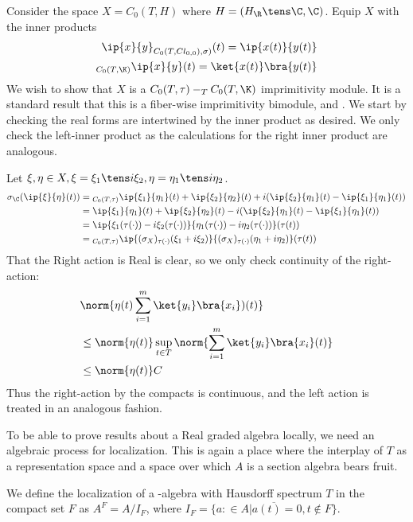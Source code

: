 \begin{example}
	Consider the space $X=C_0(T,H)$ where $H=(H_\R\tens \C,\C)$. Equip $X$ with the inner products 
	\begin{align*}
		\ip{x}{y}_{C_0(T,Cl_{0,0}),\sigma)}(t)=\ip{x(t)}{y(t)} \\
		{}_{C_0(T,\K)}\ip{x}{y}(t)=\ket{x(t)}\bra{y(t)}
	\end{align*}
	We wish to show that $X$ is a $C_0(T,\tau)-_T C_0(T,\K)$ imprimitivity module.
	It is a standard result that this is a fiber-wise imprimitivity bimodule, \cite[Chapter 3]{raeburncont} and \cite[Lemma 2.17]{moutou}. We start by checking the real forms are intertwined by the inner product as desired. We only check the left-inner product as the calculations for the right inner product are analogous. 
	
	Let $\xi,\eta \in X,\xi=\xi_1\tens i\xi_2,\eta=\eta_1\tens i\eta_2$.
	\begin{align*}
		\sigma_{\C}(\ip{\xi}{\eta}(t))&={}_{C_0(T,\tau)}\ip{\xi_1}{\eta_1}(t)+\ip{\xi_2}{\eta_2}(t)+i(\ip{\xi_2}{\eta_1}(t)-\ip{\xi_1}{\eta_1}(t)) \\
		&=\ip{\xi_1}{\eta_1}(t)+\ip{\xi_2}{\eta_2}(t)-i(\ip{\xi_2}{\eta_1}(t)-\ip{\xi_1}{\eta_1}(t)) \\
		&=\ip{\xi_1(\tau(\cdot))-i\xi_2(\tau(\cdot ))}{\eta_1(\tau(\cdot))-i\eta_2(\tau(\cdot))}(\tau(t)) \\
		&={}_{C_0(T,\tau)}\ip{(\sigma_X)_{\tau(\cdot)}(\xi_1+i\xi_2)}{(\sigma_X)_{\tau(\cdot)}(\eta_1+i\eta_2)}(\tau(t))
	\end{align*}
	That the Right action is Real is clear, so we only check continuity of the right-action:
	\begin{align*}
		&\norm{\eta(t) \sum_{i=1}^m \ket{y_i}\bra{x_i})(t)} \\ 
		&\leq \norm{\eta(t)}\sup_{t\in T}\norm{\sum_{i=1}^m \ket{y_i}\bra{x_i}(t)} \\
		&\leq \norm{\eta(t)}C
	\end{align*}
	Thus the right-action by the compacts is continuous, and the left action is treated in an analogous fashion. 
\end{example}
To be able to prove results about a Real graded \Cstar algebra locally, we need an algebraic process for localization. This is again a place where the interplay of $T$ as a representation space and a space over which $A$ is a section algebra bears fruit. 
\begin{definition}
	We define the localization of a \Cstar-algebra with Hausdorff spectrum $T$ in the compact set $F$ as $A^F=A/I_F$, where $I_F=\overline{\{a:\in A | a(t)=0,t\nin F\}}$. 
\end{definition}
